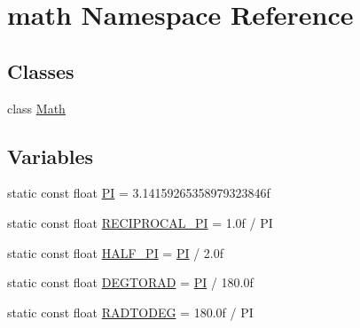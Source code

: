 \hypertarget{namespacemath}{
\section{math Namespace Reference}
\label{namespacemath}
}
\subsection*{Classes}
\begin{DoxyCompactItemize}
\item 
class \hyperlink{classmath_1_1Math}{Math}
\end{DoxyCompactItemize}
\subsection*{Variables}
\begin{DoxyCompactItemize}
\item 
static const float \hyperlink{namespacemath_a6bc2e46a09ced59adc7ca762c21672e9}{PI} = 3.14159265358979323846f
\item 
static const float \hyperlink{namespacemath_a4ec943d35c300759d313db7a5c9a28ca}{RECIPROCAL\_\-PI} = 1.0f / PI
\item 
static const float \hyperlink{namespacemath_ab0c0d4b652877ea23c84cbd2ceaba14f}{HALF\_\-PI} = \hyperlink{namespacemath_a6bc2e46a09ced59adc7ca762c21672e9}{PI} / 2.0f
\item 
static const float \hyperlink{namespacemath_a587d3c31fcbb87c5ccd1d9bb53a001ab}{DEGTORAD} = \hyperlink{namespacemath_a6bc2e46a09ced59adc7ca762c21672e9}{PI} / 180.0f
\item 
static const float \hyperlink{namespacemath_a16c58a21197921edbdf61706b7520088}{RADTODEG} = 180.0f / PI
\end{DoxyCompactItemize}


